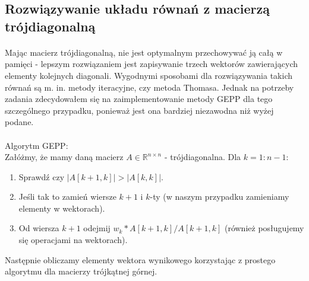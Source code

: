 \documentclass{article}
\begin{document}
\subsection{Rozwiązywanie układu równań z macierzą trójdiagonalną}
\paragraph{}
Mając macierz trójdiagonalną, nie jest optymalnym przechowywać ją całą w pamięci - lepszym rozwiązaniem jest zapisywanie trzech wektorów zawierających elementy kolejnych diagonali. Wygodnymi sposobami dla rozwiązywania takich równań są m. in. metody iteracyjne, czy metoda Thomasa. Jednak na potrzeby zadania zdecydowałem się na zaimplementowanie metody GEPP dla tego szczególnego przypadku, ponieważ jest ona bardziej niezawodna niż wyżej podane.
\paragraph{}
Algorytm GEPP:\\
Załóżmy, że mamy daną macierz $A\in\mathbb{R}^{n\times n}$ - trójdiagonalna. Dla $k=1:n-1$:
\begin{enumerate}
\item Sprawdź czy $|A[k+1,k]| > |A[k,k]|$.
\item Jeśli tak to zamień wiersze $k+1$ i $k$-ty (w naszym przypadku zamieniamy elementy w wektorach).
\item Od wiersza $k+1$ odejmij $w_{k}*A[k+1,k]/A[k+1,k]$ (również posługujemy się operacjami na wektorach).
\end{enumerate}
Następnie obliczamy elementy wektora wynikowego korzystając z prostego algorytmu dla macierzy trójkątnej górnej.
\end{document}
